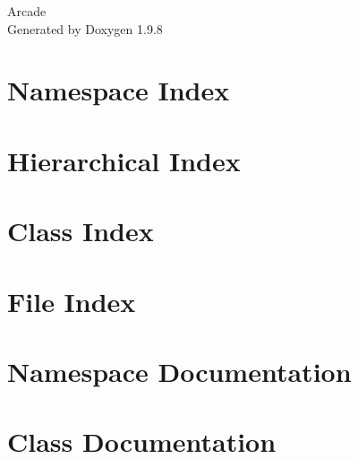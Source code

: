 \documentclass[twoside]{book}
\newcommand{\+}{\discretionary{\mbox{\scriptsize$\hookleftarrow$}}{}{}}
\newcommand{\clearemptydoublepage}{%
    \newpage{\pagestyle{empty}\cleardoublepage}%
  }
\begin{document}
  \raggedbottom
    \hypersetup{pageanchor=false,
                bookmarksnumbered=true,
                pdfencoding=unicode
               }
  \begin{titlepage}
  \vspace*{7cm}
  \begin{center}%
  {\Large Arcade}\\
  \vspace*{1cm}
  {\large Generated by Doxygen 1.9.8}\\
  \end{center}
  \end{titlepage}
  \clearemptydoublepage
  \tableofcontents
  \clearemptydoublepage
  \hypersetup{pageanchor=true}
\chapter{Namespace Index}

\chapter{Hierarchical Index}

\chapter{Class Index}

\chapter{File Index}

\chapter{Namespace Documentation}


\chapter{Class Documentation}





























\end{document}
